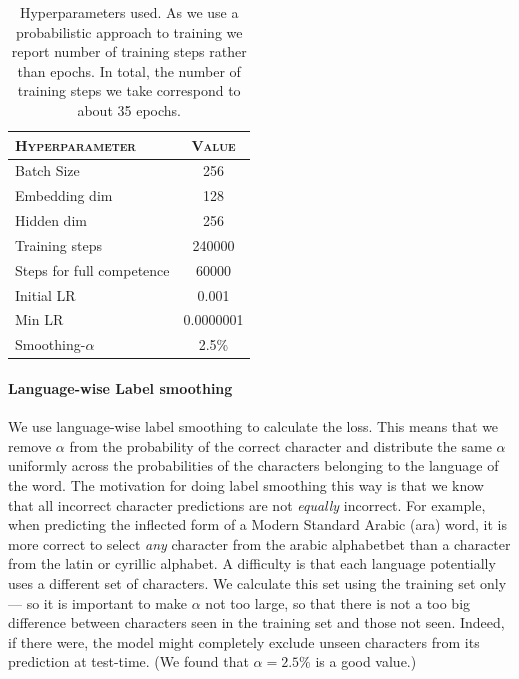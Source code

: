 \documentclass[11pt,a4paper]{article}
\begin{document}
\begin{table}[ht!]	
\centering
\begin{tabular}{lc}
\textsc{Hyperparameter} & \textsc{Value} \\
  \hline
  Batch Size & 256 \\
  Embedding dim & 128 \\
  Hidden dim & 256 \\
  Training steps & 240000 \\
  Steps for full competence & 60000 \\
  Initial LR & 0.001 \\
  Min LR & 0.0000001 \\
  Smoothing-$\alpha$ & 2.5\% \\
\end{tabular} 
\caption{Hyperparameters used. As we use a probabilistic approach to
training we report number of training steps rather than epochs. In
total, the number of training steps we take correspond to about 35
epochs.}
\label{tab:hp}
\end{table}


\paragraph{Language-wise Label smoothing} We use language-wise label
smoothing to calculate the loss. This means that we remove $\alpha$
from the probability of the correct character and distribute the same
$\alpha$ uniformly across the probabilities of the characters
belonging to the language of the word. The motivation for doing label
smoothing this way is that we know that all incorrect character
predictions are not \emph{equally} incorrect. For example, when
predicting the inflected form of a Modern Standard Arabic (ara) word,
it is more correct to select \emph{any} character from the arabic
alphabetbet than a character from the latin or cyrillic alphabet.  A
difficulty is that each language potentially uses a different set of
characters. We calculate this set using the training set only--- so it
is important to make $\alpha$ not too large, so that there is not a
too big difference between characters seen in the training set and
those not seen.  Indeed, if there were, the model might completely
exclude unseen characters from its prediction at test-time. (We found
that \(\alpha=2.5\%\) is a good value.)

\end{document}
